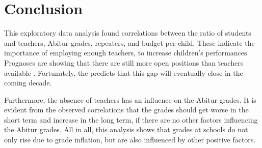 \section{Conclusion}
This exploratory data analysis found correlations between the ratio of students and teachers, Abitur grades, repeaters, and budget-per-child. These indicate the importance of employing enough teachers, to increase children's performances. Prognoses are  showing that there are still more open positions than teachers available \cite{kultusminister_konferenz_lehrkrafteeinstellungsbedarf_2023}. Fortunately, the \citeauthor{kultusminister_konferenz_lehrkrafteeinstellungsbedarf_2023} predicts that this gap will eventually close in the coming decade.

Furthermore, the absence of teachers has an influence on the Abitur grades. It is evident from the observed correlations that the grades should get worse in the short term and increase in the long term, if there are no other factors influencing the Abitur grades. All in all, this analysis shows that grades at schools do not only rise due to grade inflation, but are also influenced by other positive factors.




